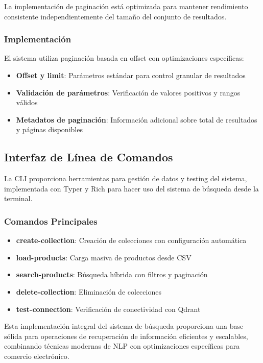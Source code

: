 La implementación de paginación está optimizada para mantener rendimiento consistente independientemente del tamaño del conjunto de resultados.

\subsubsection{Implementación}

El sistema utiliza paginación basada en offset con optimizaciones específicas:

\begin{itemize}
    \item \textbf{Offset y limit}: Parámetros estándar para control granular de resultados
    \item \textbf{Validación de parámetros}: Verificación de valores positivos y rangos válidos
    \item \textbf{Metadatos de paginación}: Información adicional sobre total de resultados y páginas disponibles
\end{itemize}

\subsection{Interfaz de Línea de Comandos}

La CLI proporciona herramientas para gestión de datos y testing del sistema, implementada con Typer y Rich para hacer uso del sistema de búsqueda desde la terminal.

\subsubsection{Comandos Principales}

\begin{itemize}
    \item \textbf{create-collection}: Creación de colecciones con configuración automática
    \item \textbf{load-products}: Carga masiva de productos desde CSV
    \item \textbf{search-products}: Búsqueda híbrida con filtros y paginación
    \item \textbf{delete-collection}: Eliminación de colecciones
    \item \textbf{test-connection}: Verificación de conectividad con Qdrant
\end{itemize}

Esta implementación integral del sistema de búsqueda proporciona una base sólida para operaciones de recuperación de información eficientes y escalables, combinando técnicas modernas de NLP con optimizaciones específicas para comercio electrónico.
